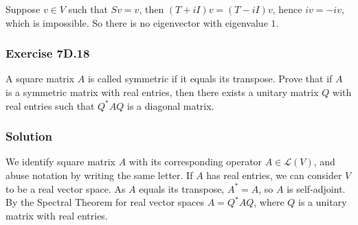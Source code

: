 Suppose $v \in V$ such that $Sv = v$, then $(T + iI)v = (T - iI)v$, hence $iv = -iv$, which is impossible.
So there is no eigenvector with eigenvalue $1$.


\subsubsection*{Exercise 7D.18}

A square matrix $A$ is called symmetric if it equals its transpose.
Prove that if $A$ is a symmetric matrix with real entries, then there exists a unitary matrix $Q$ with real entries such that $Q^*AQ$ is a diagonal matrix.

\subsubsection*{Solution}

We identify square matrix $A$ with its corresponding operator $A \in \mathcal{L}(V)$, and abuse notation by writing the same letter.
If $A$ has real entries, we can consider $V$ to be a real vector space.
As $A$ equals its transpose, $A^* = A$, so $A$ is self-adjoint.
By the Spectral Theorem for real vector spaces $A = Q^*AQ$, where $Q$ is a unitary matrix with real entries.
